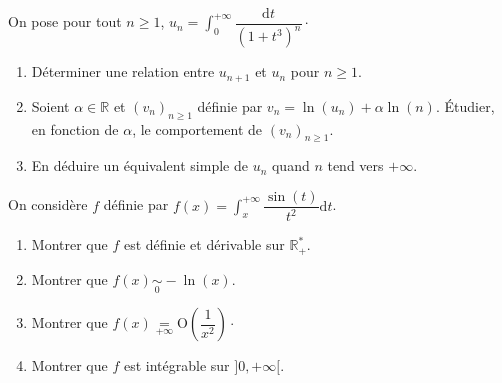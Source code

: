 \documentclass[a4paper,twoside,french,11pt]{VcCours}
\newcommand{\dt}{\text{d}t}
\begin{document}
\begin{Exercice}{} On pose pour tout $n \geq 1$, $u_n = \int_{0}^{+ \infty} \dfrac{\dt}{(1+t^3)^n} \cdot$
\begin{enumerate}
\item Déterminer une relation entre $u_{n+1}$ et $u_n$ pour $n \geq 1$.
\item Soient $\alpha \in \mathbb{R}$ et $(v_n)_{n \geq 1}$ définie par $v_n = \ln(u_n) + \alpha \ln(n)$. Étudier, en fonction de $\alpha$, le comportement de $(v_n)_{n \geq 1}$.
\item En déduire un équivalent simple de $u_n$ quand $n$ tend vers $+ \infty$.
\end{enumerate}
\end{Exercice} 

\begin{Exercice}{} On considère $f$ définie par $f(x)= \int_x^{+ \infty} \dfrac{\sin(t)}{t^2} \dt$.
\begin{enumerate}
\item Montrer que $f$ est définie et dérivable sur $\mathbb{R}_+^{*}$.
\item Montrer que $f(x) \underset{0}{\sim} -\ln(x)$.
\item Montrer que $f(x) \underset{+ \infty}{=} \textrm{O} \left( \dfrac{1}{x^2} \right) \cdot$
\item Montrer que $f$ est intégrable sur $]0, + \infty[$.
\end{enumerate}
\end{Exercice}
\end{document}
